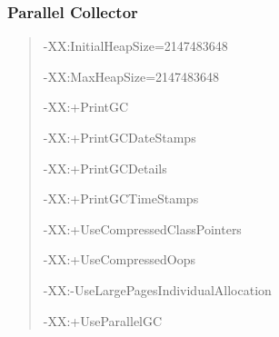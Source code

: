 \documentclass[11pt,a4paper]{article}
\begin{document}
\subsubsection*{Parallel  Collector}
\begin{quote}
-XX:InitialHeapSize=2147483648

-XX:MaxHeapSize=2147483648

-XX:+PrintGC

-XX:+PrintGCDateStamps

-XX:+PrintGCDetails

-XX:+PrintGCTimeStamps

-XX:+UseCompressedClassPointers

-XX:+UseCompressedOops

-XX:-UseLargePagesIndividualAllocation

-XX:+UseParallelGC
\end{quote}
\end{document}
